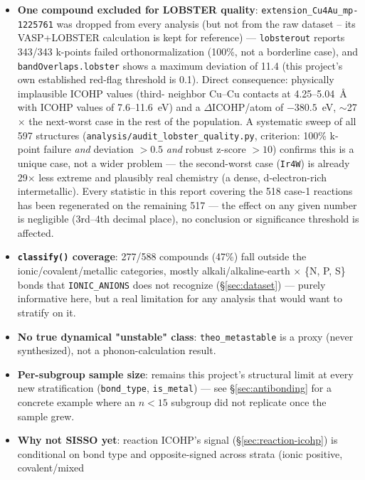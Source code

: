 \documentclass[11pt,a4paper]{article}
\begin{document}
\begin{itemize}
  \item \textbf{One compound excluded for LOBSTER quality}:
    \texttt{extension\_Cu4Au\_mp-1225761} was dropped from every
    analysis (but not from the raw dataset -- its VASP+LOBSTER
    calculation is kept for reference) --- \texttt{lobsterout} reports
    343/343 k-points failed orthonormalization (100\%, not a borderline
    case), and \texttt{bandOverlaps.lobster} shows a maximum deviation
    of 11.4 (this project's own established red-flag threshold is 0.1).
    Direct consequence: physically implausible ICOHP values (third-
    neighbor Cu--Cu contacts at 4.25--5.04~\AA{} with ICOHP values of
    7.6--11.6~eV) and a $\Delta$ICOHP/atom of $-380.5$~eV,
    $\sim$27$\times$ the next-worst case in the rest of the population.
    A systematic sweep of all 597 structures
    (\texttt{analysis/audit\_lobster\_quality.py}, criterion: 100\%
    k-point failure \emph{and} deviation $>0.5$ \emph{and} robust
    z-score $>10$) confirms this is a unique case, not a wider problem
    --- the second-worst case (\texttt{Ir4W}) is already 29$\times$ less
    extreme and plausibly real chemistry (a dense, d-electron-rich
    intermetallic). Every statistic in this report covering the 518
    case-1 reactions has been regenerated on the remaining 517 ---
    the effect on any given number is negligible (3rd--4th decimal
    place), no conclusion or significance threshold is affected.
  \item \textbf{\texttt{classify()} coverage}: 277/588 compounds (47\%)
    fall outside the ionic/covalent/metallic categories, mostly
    alkali/alkaline-earth $\times$ \{N, P, S\} bonds that
    \texttt{IONIC\_ANIONS} does not recognize (\S\ref{sec:dataset}) ---
    purely informative here, but a real limitation for any analysis that
    would want to stratify on it.
  \item \textbf{No true dynamical "unstable" class}: \texttt{theo\_metastable}
    is a proxy (never synthesized), not a phonon-calculation result.
  \item \textbf{Per-subgroup sample size}: remains this project's
    structural limit at every new stratification (\texttt{bond\_type},
    \texttt{is\_metal}) --- see \S\ref{sec:antibonding} for a concrete
    example where an $n<15$ subgroup did not replicate once the sample
    grew.
  \item \textbf{Why not SISSO yet}: reaction ICOHP's signal
    (\S\ref{sec:reaction-icohp}) is conditional on bond type and
    opposite-signed across strata (ionic positive, covalent/mixed

\end{itemize}
\end{document}
